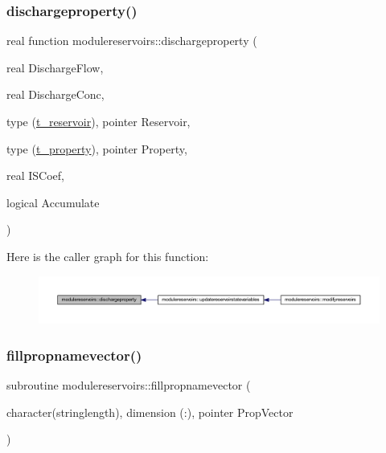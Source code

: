 \subsubsection{\texorpdfstring{dischargeproperty()}{dischargeproperty()}}
{\footnotesize\ttfamily real function modulereservoirs\+::dischargeproperty (\begin{DoxyParamCaption}\item[{real}]{Discharge\+Flow,  }\item[{real}]{Discharge\+Conc,  }\item[{type (\mbox{\hyperlink{structmodulereservoirs_1_1t__reservoir}{t\+\_\+reservoir}}), pointer}]{Reservoir,  }\item[{type (\mbox{\hyperlink{structmodulereservoirs_1_1t__property}{t\+\_\+property}}), pointer}]{Property,  }\item[{real}]{I\+S\+Coef,  }\item[{logical}]{Accumulate }\end{DoxyParamCaption})\hspace{0.3cm}{\ttfamily [private]}}

Here is the caller graph for this function\+:\nopagebreak
\begin{figure}[H]
\begin{center}
\leavevmode
\includegraphics[width=350pt]{namespacemodulereservoirs_ad77a25bc54ff54f0753ca4576febd9fb_icgraph}
\end{center}
\end{figure}
\mbox{\label{namespacemodulereservoirs_a4297360b11f2cc348b2bb6524d4307b9}} 
\subsubsection{\texorpdfstring{fillpropnamevector()}{fillpropnamevector()}}
{\footnotesize\ttfamily subroutine modulereservoirs\+::fillpropnamevector (\begin{DoxyParamCaption}\item[{character(stringlength), dimension (\+:), pointer}]{Prop\+Vector }\end{DoxyParamCaption})\hspace{0.3cm}{\ttfamily [private]}}


